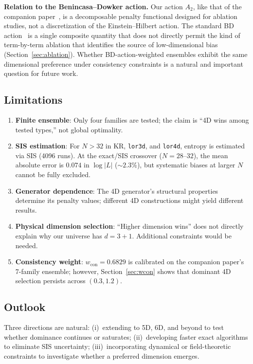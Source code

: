 \documentclass[11pt,a4paper]{article}
\begin{document}
\textbf{Relation to the Benincasa--Dowker action.} Our action $A_2$, like that of the companion paper~\cite{zhang2026companion}, is a decomposable penalty functional designed for ablation studies, not a discretization of the Einstein--Hilbert action. The standard BD action~\cite{benincasa2010,benincasa2011} is a single composite quantity that does not directly permit the kind of term-by-term ablation that identifies the source of low-dimensional bias (Section~\ref{sec:ablation}). Whether BD-action-weighted ensembles exhibit the same dimensional preference under consistency constraints is a natural and important question for future work.

\subsection{Limitations}

\begin{enumerate}[nosep]
    \item \textbf{Finite ensemble}: Only four families are tested; the claim is ``4D wins among tested types,'' not global optimality.
    \item \textbf{SIS estimation}: For $N > 32$ in KR, \texttt{lor3d}, and \texttt{lor4d}, entropy is estimated via SIS (4096 runs). At the exact/SIS crossover ($N = 28$--$32$), the mean absolute error is $0.074$ in $\log|L|$ ($\sim 2.3\%$), but systematic biases at larger $N$ cannot be fully excluded.
    \item \textbf{Generator dependence}: The 4D generator's structural properties determine its penalty values; different 4D constructions might yield different results.
    \item \textbf{Physical dimension selection}: ``Higher dimension wins'' does not directly explain why our universe has $d = 3{+}1$. Additional constraints would be needed.
    \item \textbf{Consistency weight}: $w_{\text{con}} = 0.6829$ is calibrated on the companion paper's 7-family ensemble; however, Section~\ref{sec:wcon} shows that dominant 4D selection persists across $(0.3, 1.2)$.
\end{enumerate}

\subsection{Outlook}

Three directions are natural: (i)~extending to 5D, 6D, and beyond to test whether dominance continues or saturates; (ii)~developing faster exact algorithms to eliminate SIS uncertainty; (iii)~incorporating dynamical or field-theoretic constraints to investigate whether a preferred dimension emerges.
\end{document}
